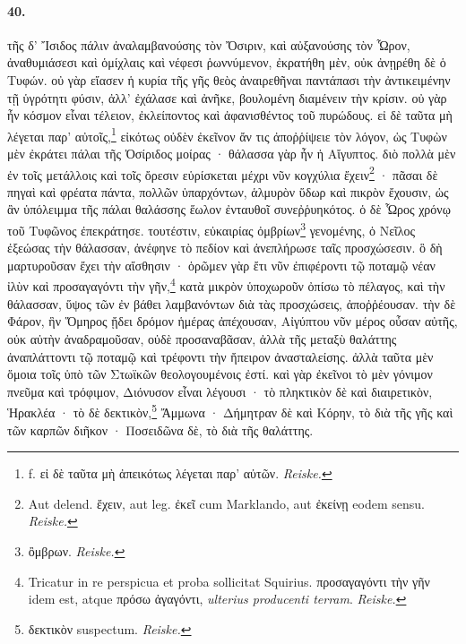 \documentclass[a4paper, 11pt, oneside, polutonikogreek, german]{article}
\begin{document}
\paragraph{40.}
τῆς δ' Ἴσιδος πάλιν ἀναλαμβανούσης τὸν Ὄσιριν, καὶ αὐξανούσης τὸν Ὧρον, ἀναθυμιάσεσι καὶ ὁμίχλαις καὶ νέφεσι ῥωννύμενον, ἐκρατήθη μὲν, οὐκ ἀνῃρέθη δὲ ὁ Τυφών. οὐ γὰρ εἴασεν ἡ κυρία τῆς γῆς θεὸς ἀναιρεθῆναι παντάπασι τὴν ἀντικειμένην τῇ ὑγρότητι φύσιν, ἀλλ' ἐχάλασε καὶ ἀνῆκε, βουλομένη διαμένειν τὴν κρίσιν. οὐ γὰρ ἦν κόσμον εἶναι τέλειον, ἐκλείποντος καὶ ἀφανισθέντος τοῦ πυρώδους. εἰ δὲ ταῦτα μὴ λέγεται παρ' αὐτοῖς,\footnote{f. εἰ δὲ ταῦτα μὴ ἀπεικότως λέγεται παρ' αὐτῶν. \emph{Reiske.}} εἰκότως οὐδὲν ἐκεῖνον ἄν τις ἀποῤῥίψειε τὸν λόγον, ὡς Τυφὼν μὲν ἐκράτει πάλαι τῆς Ὀσίριδος μοίρας · θάλασσα γὰρ ἦν ἡ Αἴγυπτος. διὸ πολλὰ μὲν ἐν τοῖς μετάλλοις καὶ τοῖς ὄρεσιν εὑρίσκεται μέχρι νῦν κογχύλια ἔχειν\footnote{Aut delend. ἔχειν, aut leg. ἐκεῖ cum Marklando, aut ἐκείνῃ eodem sensu. \emph{Reiske.}} · πᾶσαι δὲ πηγαὶ καὶ φρέατα πάντα, πολλῶν ὑπαρχόντων, ἁλμυρὸν ὕδωρ καὶ πικρὸν ἔχουσιν, ὡς ἂν ὑπόλειμμα τῆς πάλαι θαλάσσης ἕωλον ἐνταυθοῖ συνεῤῥυηκότος. ὁ δὲ Ὧρος χρόνῳ τοῦ Τυφῶνος ἐπεκράτησε. τουτέστιν, εὐκαιρίας ὀμβρίων\footnote{ὂμβρων. \emph{Reiske.}} γενομένης, ὁ Νεῖλος ἐξεώσας τὴν θάλασσαν, ἀνέφηνε τὸ πεδίον καὶ ἀνεπλήρωσε ταῖς προσχώσεσιν. ὃ δὴ μαρτυροῦσαν ἔχει τὴν αἴσθησιν · ὁρῶμεν γὰρ ἔτι νῦν ἐπιφέροντι τῷ ποταμῷ νέαν ἰλὺν καὶ προσαγαγόντι τὴν γῆν,\footnote{Tricatur in re perspicua et proba sollicitat Squirius. προσαγαγόντι τὴν γῆν idem est, atque πρόσω ἀγαγόντι, \emph{ulterius producenti terram}. \emph{Reiske.}} κατὰ μικρὸν ὑποχωροῦν ὀπίσω τὸ πέλαγος, καὶ τὴν θάλασσαν, ὕψος τῶν ἐν βάθει λαμβανόντων διὰ τὰς προσχώσεις, ἀποῤῥέουσαν. τὴν δὲ Φάρον, ἣν Ὅμηρος ᾔδει δρόμον ἡμέρας ἀπέχουσαν, Αἰγύπτου νῦν μέρος οὖσαν αὐτῆς, οὐκ αὐτὴν ἀναδραμοῦσαν, οὐδὲ προσαναβᾶσαν, ἀλλὰ τῆς μεταξὺ θαλάττης ἀναπλάττοντι τῷ ποταμῷ καὶ τρέφοντι τὴν ἤπειρον ἀνασταλείσης. ἀλλὰ ταῦτα μὲν ὅμοια τοῖς ὑπὸ τῶν Στωϊκῶν θεολογουμένοις ἐστί. καὶ γὰρ ἐκεῖνοι τὸ μὲν γόνιμον πνεῦμα καὶ τρόφιμον, Διόνυσον εἶναι λέγουσι · τὸ πληκτικὸν δὲ καὶ διαιρετικὸν, Ἡρακλέα · τὸ δὲ δεκτικὸν,\footnote{δεκτικὸν suspectum. \emph{Reiske.}} Ἄμμωνα · Δήμητραν δὲ καὶ Κόρην, τὸ διὰ τῆς γῆς καὶ τῶν καρπῶν διῆκον · Ποσειδῶνα δὲ, τὸ διὰ τῆς θαλάττης.
\end{document}
